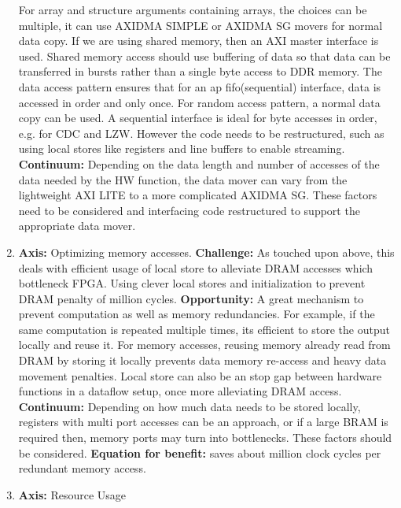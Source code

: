 \documentclass{article}
\begin{document}
\begin{enumerate}
For array and structure arguments containing arrays, the choices can be multiple, it can use AXIDMA SIMPLE or AXIDMA SG movers for normal data copy. 
If we are using shared memory, then an AXI master interface is used. Shared memory access should use buffering of data so that data can be transferred in bursts rather than a single byte access to DDR memory.
The data access pattern ensures that for an ap fifo(sequential) interface, data is accessed in order and only once. For random access pattern, a normal data copy can be used. 
A sequential interface is ideal for byte accesses in order, e.g. for CDC and LZW. However the code needs to be restructured, such as using local stores like registers and line buffers to enable streaming. 
\newline
\textbf{Continuum:} Depending on the data length and number of accesses of the data needed by the HW function, the data mover can vary from the lightweight AXI LITE to a more complicated AXIDMA SG. These factors need to be considered and interfacing code restructured to support the appropriate data mover.
\newline
\item%
\textbf{Axis:} Optimizing memory accesses. 
\newline
\textbf{Challenge: } As touched upon above, this deals with efficient usage of local store to alleviate DRAM accesses which bottleneck FPGA. Using clever local stores and initialization to prevent DRAM penalty of million cycles.
\newline
\textbf{Opportunity: } A great mechanism to prevent computation as well as memory redundancies. For example, if the same computation is repeated multiple times, its efficient to store the output locally and reuse it. 
For memory accesses, reusing memory already read from DRAM by storing it locally prevents data memory re-access and heavy data movement penalties. 
Local store can also be an stop gap between hardware functions in a dataflow setup, once more alleviating DRAM access.
\newline
\textbf{Continuum: } Depending on how much data needs to be stored locally, registers with multi port accesses can be an approach, or if a large BRAM is required then, memory ports may turn into bottlenecks. These factors should be considered. 
\newline
\textbf{Equation for benefit: } saves about million clock cycles per redundant memory access.
\item%
\textbf{Axis:} Resource Usage
\newline

\end{enumerate}
\end{document}
